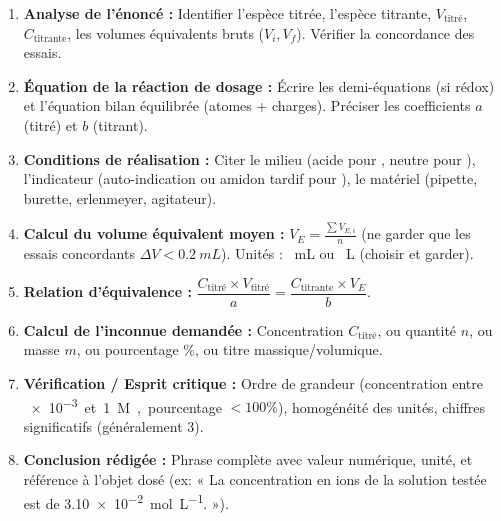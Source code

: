 \documentclass[11pt]{article}
\begin{document}
\begin{methode}
\begin{enumerate}
\item \textbf{Analyse de l'énoncé :} Identifier l'espèce titrée, l'espèce titrante, $V_{\text{titré}}$, $C_{\text{titrante}}$, les volumes équivalents bruts ($V_i, V_f$). Vérifier la concordance des essais.
\item \textbf{Équation de la réaction de dosage :} Écrire les demi-équations (si rédox) et l'équation bilan équilibrée (atomes + charges). Préciser les coefficients $a$ (titré) et $b$ (titrant).
\item \textbf{Conditions de réalisation :} Citer le milieu (acide  pour , neutre pour ), l'indicateur (auto-indication  ou amidon tardif pour ), le matériel (pipette, burette, erlenmeyer, agitateur).
\item \textbf{Calcul du volume équivalent moyen :} $V_E = \frac{\sum V_{E,i}}{n}$ (ne garder que les essais concordants $\Delta V < \SI{0,2}{mL}$). Unités : \SI{}{mL} ou \SI{}{L} (choisir et garder).
\item \textbf{Relation d'équivalence :} $\dfrac{C_{\text{titré}} \times V_{\text{titré}}}{a} = \dfrac{C_{\text{titrante}} \times V_E}{b}$.
\item \textbf{Calcul de l'inconnue demandée :} Concentration $C_{\text{titré}}$, ou quantité $n$, ou masse $m$, ou pourcentage $\%$, ou titre massique/volumique.
\item \textbf{Vérification / Esprit critique :} Ordre de grandeur (concentration entre \SI{e-3} et \SI{1}{M}, pourcentage $< 100\%$), homogénéité des unités, chiffres significatifs (généralement 3).
\item \textbf{Conclusion rédigée :} Phrase complète avec valeur numérique, unité, et référence à l'objet dosé (ex: « La concentration en ions  de la solution testée est de \SI{3,10e-2}{mol.L^{-1}}. »).
\end{enumerate}
\end{methode}
\end{document}
